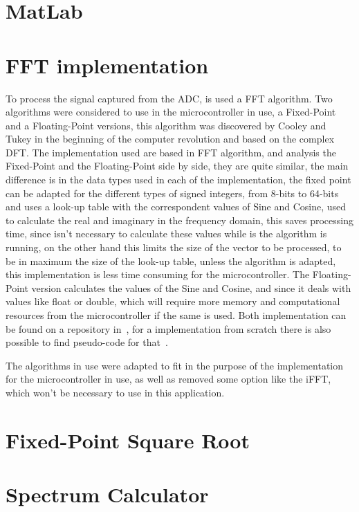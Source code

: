 \section{MatLab}
\section{FFT implementation}
To process the signal captured from the ADC, is used a FFT algorithm. Two algorithms were considered to use in the microcontroller in use, a Fixed-Point and a Floating-Point versions, this algorithm was discovered by Cooley and Tukey in the beginning of the computer revolution and based on the complex DFT. The implementation used are based in FFT algorithm, and analysis the Fixed-Point and the Floating-Point side by side, they are quite similar, the main difference is in the data types used in each of the implementation, the fixed point can be adapted for the different types of signed integers, from 8-bits to 64-bits and uses a look-up table with the correspondent values of Sine and Cosine, used to calculate the real and imaginary in the frequency domain, this saves processing time, since isn't necessary to calculate these values while is the algorithm is running, on the other hand this limits the size of the vector to be processed, to be in maximum the size of the look-up table, unless the algorithm is adapted, this implementation is less time consuming for the microcontroller. The Floating-Point version calculates the values of the Sine and Cosine, and since it deals with values like float or double, which will require more memory and computational resources from the microcontroller if the same is used. Both implementation can be found on a repository in~\cite{262588213843476FixFft,Dannyf00FloatingPointFFTBenchmarka}, for a implementation from scratch there is also possible to find pseudo-code for that~\cite{smith1997scientist}.

The algorithms in use were adapted to fit in the purpose of the implementation for the microcontroller in use, as well as removed some option like the iFFT, which won't be necessary to use in this application.
\section{Fixed-Point Square Root}

\section{Spectrum Calculator}


